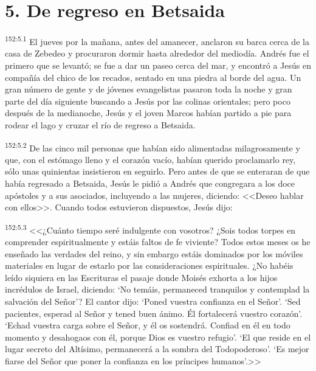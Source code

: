 \section*{5. De regreso en Betsaida}
\par 
\textsuperscript{152:5.1} El jueves por la mañana, antes del amanecer, anclaron su barca cerca de la casa de Zebedeo y procuraron dormir hasta alrededor del mediodía. Andrés fue el primero que se levantó; se fue a dar un paseo cerca del mar, y encontró a Jesús en compañía del chico de los recados, sentado en una piedra al borde del agua. Un gran número de gente y de jóvenes evangelistas pasaron toda la noche y gran parte del día siguiente buscando a Jesús por las colinas orientales; pero poco después de la medianoche, Jesús y el joven Marcos habían partido a pie para rodear el lago y cruzar el río de regreso a Betsaida.

\par 
\textsuperscript{152:5.2} De las cinco mil personas que habían sido alimentadas milagrosamente y que, con el estómago lleno y el corazón vacío, habían querido proclamarlo rey, sólo unas quinientas insistieron en seguirlo. Pero antes de que se enteraran de que había regresado a Betsaida, Jesús le pidió a Andrés que congregara a los doce apóstoles y a sus asociados, incluyendo a las mujeres, diciendo: <<Deseo hablar con ellos>>. Cuando todos estuvieron dispuestos, Jesús dijo:

\par 
\textsuperscript{152:5.3} <<¿Cuánto tiempo seré indulgente con vosotros? ¿Sois todos torpes en comprender espiritualmente y estáis faltos de fe viviente? Todos estos meses os he enseñado las verdades del reino, y sin embargo estáis dominados por los móviles materiales en lugar de estarlo por las consideraciones espirituales. ¿No habéis leído siquiera en las Escrituras el pasaje donde Moisés exhorta a los hijos incrédulos de Israel, diciendo: `No temáis, permaneced tranquilos y contemplad la salvación del Señor'? El cantor dijo: `Poned vuestra confianza en el Señor'. `Sed pacientes, esperad al Señor y tened buen ánimo. Él fortalecerá vuestro corazón'. `Echad vuestra carga sobre el Señor, y él os sostendrá. Confiad en él en todo momento y desahogaos con él, porque Dios es vuestro refugio'. `El que reside en el lugar secreto del Altísimo, permanecerá a la sombra del Todopoderoso'. `Es mejor fiarse del Señor que poner la confianza en los príncipes humanos'.>>


